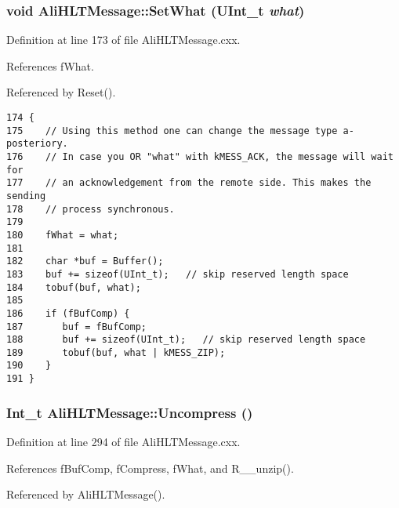 \subsubsection{\setlength{\rightskip}{0pt plus 5cm}void Ali\-HLTMessage::Set\-What (UInt\_\-t {\em what})}\label{classAliHLTMessage_a9}




Definition at line 173 of file Ali\-HLTMessage.cxx.

References f\-What.

Referenced by Reset().

\footnotesize\begin{verbatim}174 {
175    // Using this method one can change the message type a-posteriory.
176    // In case you OR "what" with kMESS_ACK, the message will wait for
177    // an acknowledgement from the remote side. This makes the sending
178    // process synchronous.
179 
180    fWhat = what;
181 
182    char *buf = Buffer();
183    buf += sizeof(UInt_t);   // skip reserved length space
184    tobuf(buf, what);
185 
186    if (fBufComp) {
187       buf = fBufComp;
188       buf += sizeof(UInt_t);   // skip reserved length space
189       tobuf(buf, what | kMESS_ZIP);
190    }
191 }
\end{verbatim}\normalsize 


\subsubsection{\setlength{\rightskip}{0pt plus 5cm}Int\_\-t Ali\-HLTMessage::Uncompress ()}\label{classAliHLTMessage_a13}




Definition at line 294 of file Ali\-HLTMessage.cxx.

References f\-Buf\-Comp, f\-Compress, f\-What, and R\_\-\_\-unzip().

Referenced by Ali\-HLTMessage().

